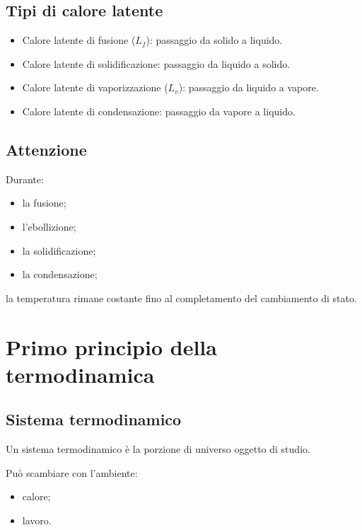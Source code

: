 \subsection{Tipi di calore latente}

\begin{itemize}
    \item Calore latente di fusione ($L_f$): passaggio da solido a liquido.
    \item Calore latente di solidificazione: passaggio da liquido a solido.
    \item Calore latente di vaporizzazione ($L_v$): passaggio da liquido a vapore.
    \item Calore latente di condensazione: passaggio da vapore a liquido.
\end{itemize}

\subsection{Attenzione}

Durante:

\begin{itemize}
    \item la fusione;
    \item l'ebollizione;
    \item la solidificazione;
    \item la condensazione;
\end{itemize}

\noindent la temperatura rimane costante fino al completamento del cambiamento di stato.

\vspace{0.3cm}
\section{Primo principio della termodinamica}

\subsection{Sistema termodinamico}

\noindent Un sistema termodinamico è la porzione di universo oggetto di studio.

\noindent Può scambiare con l'ambiente:

\begin{itemize}
    \item calore;
    \item lavoro.
\end{itemize}

